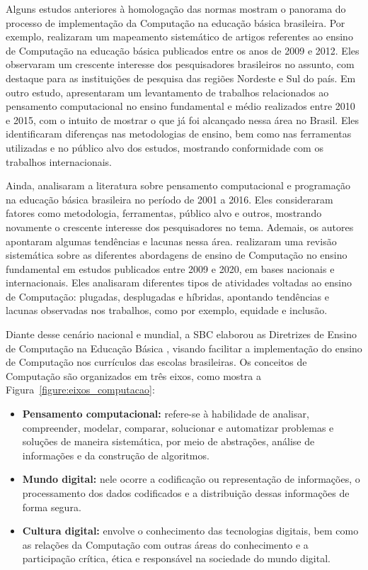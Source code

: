 Alguns estudos anteriores à homologação das normas mostram o panorama do processo de implementação da Computação na educação básica brasileira. Por exemplo, \citet{defranca2013ensino} realizaram um mapeamento sistemático de artigos referentes ao ensino de Computação na educação básica publicados entre os anos de 2009 e 2012. Eles observaram um crescente interesse dos pesquisadores brasileiros no assunto, com destaque para as instituições de pesquisa das regiões Nordeste e Sul do país. Em outro estudo, \citet{bordini2016computaccao} apresentaram um levantamento de trabalhos relacionados ao pensamento computacional no ensino fundamental e médio realizados entre 2010 e 2015, com o intuito de mostrar o que já foi alcançado nessa área no Brasil. Eles identificaram diferenças nas metodologias de ensino, bem como nas ferramentas utilizadas e no público alvo dos estudos, mostrando conformidade com os trabalhos internacionais.

Ainda, \citet{santos2018mapping} analisaram a literatura sobre pensamento computacional e programação na educação básica brasileira no período de 2001 a 2016.  Eles consideraram fatores como metodologia, ferramentas, público alvo e outros, mostrando novamente o crescente interesse dos pesquisadores no tema. Ademais, os autores apontaram algumas tendências e lacunas nessa área. \citet{dossantos2021ensinar} realizaram uma revisão sistemática sobre as diferentes abordagens de ensino de Computação no ensino fundamental em estudos publicados entre 2009 e 2020, em bases nacionais e internacionais. Eles analisaram diferentes tipos de atividades voltadas ao ensino de Computação: plugadas, desplugadas e híbridas, apontando tendências e lacunas observadas nos trabalhos, como por exemplo, equidade e inclusão.

Diante desse cenário nacional e mundial, a SBC elaborou as Diretrizes de Ensino de Computação na Educação Básica \citep{ribeiro2019diretrizes}, visando facilitar a implementação do ensino de Computação nos currículos das escolas brasileiras. Os conceitos de Computação são organizados em três eixos, como mostra a Figura~\ref{figure:eixos_computacao}:

\begin{itemize}
    \item \textbf{Pensamento computacional:} refere-se à habilidade de analisar, compreender, modelar, comparar, solucionar e automatizar problemas e soluções de maneira sistemática, por meio de abstrações, análise de informações e da construção de algoritmos. 
    \item \textbf{Mundo digital:} nele ocorre a codificação ou representação de informações, o processamento dos dados codificados e a distribuição dessas informações de forma segura.
    \item \textbf{Cultura digital:} envolve o conhecimento das tecnologias digitais, bem como as relações da Computação com outras áreas do conhecimento e a participação crítica, ética e responsável na sociedade do mundo digital.
\end{itemize}

